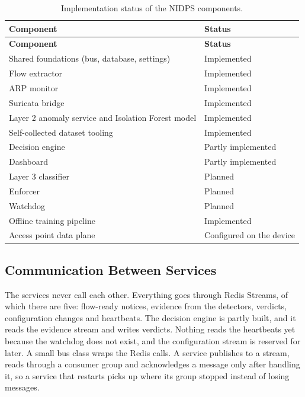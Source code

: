 {\small
\begin{longtable}{|>{\raggedright\arraybackslash}p{}|>{\raggedright\arraybackslash}p{}|}
\caption{Implementation status of the NIDPS components.}\label{tab:7.2}\\
\hline
\textbf{Component} & \textbf{Status} \\ \hline
\endfirsthead
\hline
\textbf{Component} & \textbf{Status} \\ \hline
\endhead
Shared foundations (bus, database, settings) & Implemented \\ \hline
Flow extractor & Implemented \\ \hline
ARP monitor & Implemented \\ \hline
Suricata bridge & Implemented \\ \hline
Layer 2 anomaly service and Isolation Forest model & Implemented \\ \hline
Self-collected dataset tooling & Implemented \\ \hline
Decision engine & Partly implemented \\ \hline
Dashboard & Partly implemented \\ \hline
Layer 3 classifier & Planned \\ \hline
Enforcer & Planned \\ \hline
Watchdog & Planned \\ \hline
Offline training pipeline & Implemented \\ \hline
Access point data plane & Configured on the device \\ \hline
\end{longtable}
}

\subsection{Communication Between Services}\label{sec:7.1.3}

\noindent The services never call each other. Everything goes through Redis Streams, of which there are five: flow-ready notices, evidence from the detectors, verdicts, configuration changes and heartbeats. The decision engine is partly built, and it reads the evidence stream and writes verdicts. Nothing reads the heartbeats yet because the watchdog does not exist, and the configuration stream is reserved for later. A small bus class wraps the Redis calls. A service publishes to a stream, reads through a consumer group and acknowledges a message only after handling it, so a service that restarts picks up where its group stopped instead of losing messages.

